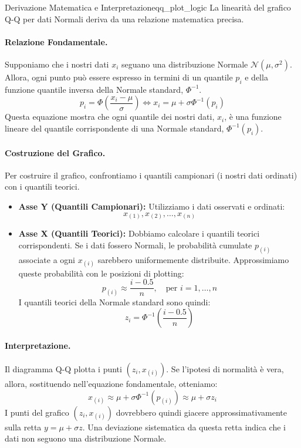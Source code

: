 \begin{nota}{Derivazione Matematica e Interpretazione}{qq_plot_logic}
La linearità del grafico Q-Q per dati Normali deriva da una relazione matematica precisa.

\paragraph{Relazione Fondamentale.}
Supponiamo che i nostri dati \( x_i \) seguano una distribuzione Normale \( \mathcal{N}(\mu, \sigma^2) \). Allora, ogni punto può essere espresso in termini di un quantile \( p_i \) e della funzione quantile inversa della Normale standard, \( \Phi^{-1} \).
\[
p_i = \Phi\left(\frac{x_i - \mu}{\sigma}\right) \iff x_i = \mu + \sigma \Phi^{-1}(p_i)
\]
Questa equazione mostra che ogni quantile dei nostri dati, \( x_i \), è una funzione lineare del quantile corrispondente di una Normale standard, \( \Phi^{-1}(p_i) \).

\paragraph{Costruzione del Grafico.}
Per costruire il grafico, confrontiamo i quantili campionari (i nostri dati ordinati) con i quantili teorici.
\begin{itemize}
    \item \textbf{Asse Y (Quantili Campionari):} Utilizziamo i dati osservati e ordinati: \[ x_{(1)}, x_{(2)}, \dots, x_{(n)} \]
    \item \textbf{Asse X (Quantili Teorici):} Dobbiamo calcolare i quantili teorici corrispondenti. Se i dati fossero Normali, le probabilità cumulate \( p_{(i)} \) associate a ogni \( x_{(i)} \) sarebbero uniformemente distribuite. Approssimiamo queste probabilità con le posizioni di plotting:
    \[
    p_{(i)} \approx \frac{i-0.5}{n}, \quad \text{per } i=1, \dots, n
    \]
    I quantili teorici della Normale standard sono quindi:
    \[
    z_i = \Phi^{-1}\left( \frac{i-0.5}{n} \right)
    \]
\end{itemize}

\paragraph{Interpretazione.}
Il diagramma Q-Q plotta i punti \( (z_i, x_{(i)}) \). Se l'ipotesi di normalità è vera, allora, sostituendo nell'equazione fondamentale, otteniamo:
\[
x_{(i)} \approx \mu + \sigma \Phi^{-1}(p_{(i)}) \approx \mu + \sigma z_i
\]
I punti del grafico \( (z_i, x_{(i)}) \) dovrebbero quindi giacere approssimativamente sulla retta \( y = \mu + \sigma z \). Una deviazione sistematica da questa retta indica che i dati non seguono una distribuzione Normale.
\end{nota}

